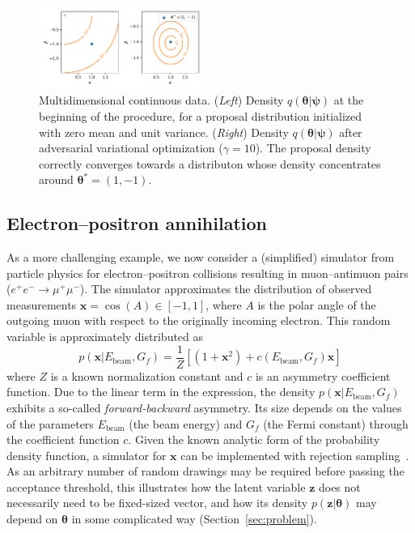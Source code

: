 \documentclass[twocolumn,superscriptaddress,aps]{revtex4-1}
\newcommand{\bftheta}{{\bm \theta}}
\newcommand{\bfpsi}{{\bm \psi}}
\newcommand{\bfz}{\mathbf{z}}
\theoremstyle{plain}
\begin{document}
\begin{figure}
    \centering
    \includegraphics[width=0.48\textwidth]{figures/multi.pdf}
    \caption{Multidimensional continuous data.
             ({\it Left}) Density $q(\bftheta|\bfpsi)$ at the beginning of the procedure, for a proposal distribution initialized with zero mean and unit variance.
             ({\it Right}) Density $q(\bftheta|\bfpsi)$ after adversarial variational optimization ($\gamma=10$). The proposal density correctly converges towards a distributon whose density concentrates around $\bftheta^* = (1, -1)$.
             }\label{fig:multi}
\end{figure}


\subsection{Electron--positron annihilation}

As a more challenging example, we now consider a (simplified) simulator from
particle physics for electron--positron collisions resulting in muon--antimuon
pairs ($e^+e^- \rightarrow \mu^+\mu^-$). The simulator approximates the
distribution of observed measurements $\mathbf{x} = \cos(A) \in [-1,1]$, where $A$ is the
polar angle of the outgoing muon with respect  to the originally incoming
electron. This random variable is approximately distributed as
\begin{equation}
    p(\mathbf{x}|E_\text{beam}, G_f) = \frac{1}{Z} \left[ (1 + \mathbf{x}^2) + c(E_\text{beam}, G_f) \mathbf{x} \right]
\end{equation}
where $Z$ is a known normalization constant and $c$ is an asymmetry coefficient
function. Due to the linear term in the expression, the density $p(\mathbf{x} |
E_\text{beam}, G_f)$ exhibits a so-called {\it forward-backward} asymmetry.  Its
size depends on the values of the parameters $E_\text{beam}$ (the beam energy)
and $G_f$ (the Fermi constant) through the coefficient function $c$. Given the
known analytic form of the probability density function, a simulator for
$\mathbf{x}$ can be implemented with rejection sampling~\citep{von195113}. As an
arbitrary number of random drawings may be required before passing the
acceptance threshold, this illustrates how the latent variable
$\bfz$ does not necessarily need to be fixed-sized vector, and how its
density  $p(\bfz|\bftheta)$ may depend on $\bftheta$ in some complicated way
(Section~\ref{sec:problem}).
\end{document}
